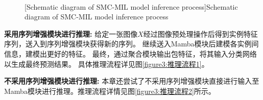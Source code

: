 \begin{figure}[h]
  \centering
  \\
  [Schematic diagram of SMC-MIL model inference process]{Schematic diagram of SMC-MIL model inference process}
  \label{figure3: 推理流程}
\end{figure}

\textbf{采用序列增强模块进行推理:} 给定一张图像$X$经过图像预处理操作后得到实例特征序列，送入到序列增强模块获得新的序列。
继续送入Mamba模块后建模各实例间信息，建模出更好的特征。
最终，通过聚合模块输出包特征，将其输入分类网络以生成最终预测结果。
具体推理流程详见图\ref{figure3:推理流程1}。

\textbf{不采用序列增强模块进行推理:} 本章还尝试了不采用序列增强模块直接进行输入至Mamba模块进行推理。推理流程详情见图\ref{figure3:推理流程2}所示。

